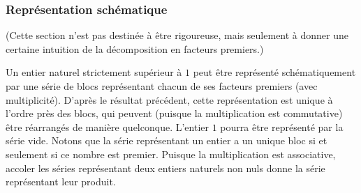 \subsubsection{Représentation schématique}

(Cette section n'est pas destinée à être rigoureuse, mais seulement à donner une certaine intuition de la décomposition en facteurs premiers.)

Un entier naturel strictement supérieur à $1$ peut être représenté schématiquement par une série de blocs représentant chacun de ses facteurs premiers (avec multiplicité). 
D'après le résultat précédent, cette représentation est unique à l'ordre près des blocs, qui peuvent (puisque la multiplication est commutative) être réarrangés de manière quelconque. 
L'entier $1$ pourra être représenté par la série vide.
Notons que la série représentant un entier a un unique bloc si et seulement si ce nombre est premier.
Puisque la multiplication est associative, accoler les séries représentant deux entiers naturels non nuls donne la série représentant leur produit.

